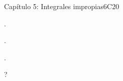 \begin{syllabus}
\begin{unit}{Capítulo 5: Integrales impropias}{}{}{6}{C20}
   \begin{learningoutcomes}
      \item .
      \item .
      \item .
   \end{learningoutcomes}   
\end{unit}



\begin{coursebibliography}
\end{coursebibliography}

?

\end{syllabus}
